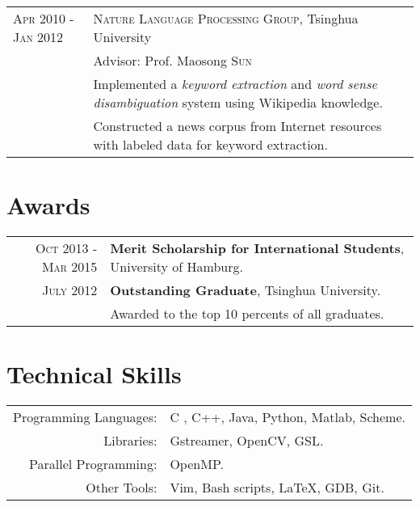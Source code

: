 \documentclass[a4paper,11pt]{article} %
\begin{document}
\begin{tabular}{R{3.5cm}|p{11cm}}

  \textsc{Apr 2010 - Jan 2012} & \textsc{Nature Language Processing Group}, Tsinghua University \\
  & {\footnotesize Advisor:} Prof. Maosong \textsc{Sun} \\
  & {\footnotesize Implemented a \textit{keyword extraction} and \textit{word sense disambiguation} system using Wikipedia knowledge.} \\
  & {\footnotesize Constructed a news corpus from Internet resources with labeled data for keyword extraction.} \\

\end{tabular}


\section{Awards}

\begin{tabular}{rl}
  \textsc{Oct 2013 - Mar 2015} & \textbf{Merit Scholarship for International Students}, {\small University of Hamburg}. \\
  \textsc{July 2012} & \textbf{Outstanding Graduate}, {\small Tsinghua University}. \\
  & {\footnotesize Awarded to the top 10 percents of all graduates.}

\end{tabular}


\section{Technical Skills}

\begin{tabular}{rl}
  Programming Languages: & C \raisebox{.8ex}{\scriptsize \ding{73}}, C++, Java, Python, Matlab, Scheme. \\
  Libraries: & Gstreamer, OpenCV, GSL. \\
  Parallel Programming: & OpenMP. \\
  Other Tools: & Vim, Bash scripts, \LaTeX, GDB, Git. \\
\end{tabular}
\end{document}
